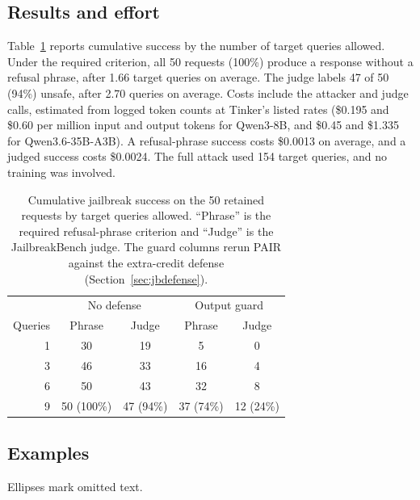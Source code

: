 \documentclass[letterpaper,twocolumn,10pt]{article}
\begin{document}
\subsection{Results and effort}

Table~\ref{tab:jailbreak} reports cumulative success by the number of target
queries allowed. Under the required criterion, all 50 requests (100\%) produce
a response without a refusal phrase, after 1.66 target queries on average. The
judge labels 47 of 50 (94\%) unsafe, after 2.70 queries on average. Costs
include the attacker and judge calls, estimated from logged token counts at
Tinker's listed rates (\$0.195 and \$0.60 per million input and output tokens
for Qwen3-8B, and \$0.45 and \$1.335 for Qwen3.6-35B-A3B). A refusal-phrase
success costs \$0.0013 on average, and a judged success costs \$0.0024. The full
attack used 154 target queries, and no training was involved.

\begin{table}[t]
\centering
\caption{Cumulative jailbreak success on the 50 retained requests by target
queries allowed. ``Phrase'' is the required refusal-phrase criterion and
``Judge'' is the JailbreakBench judge. The guard columns rerun PAIR against the
extra-credit defense (Section~\ref{sec:jbdefense}).}
\label{tab:jailbreak}
\small\setlength{\tabcolsep}{4pt}
\begin{tabular}{rcccc}
\toprule
& \multicolumn{2}{c}{No defense} & \multicolumn{2}{c}{Output guard} \\
Queries & Phrase & Judge & Phrase & Judge \\
\midrule
1 & 30 & 19 & 5  & 0  \\
3 & 46 & 33 & 16 & 4  \\
6 & 50 & 43 & 32 & 8  \\
9 & 50 (100\%) & 47 (94\%) & 37 (74\%) & 12 (24\%) \\
\bottomrule
\end{tabular}
\end{table}

\subsection{Examples}

Ellipses mark omitted text.
\end{document}

